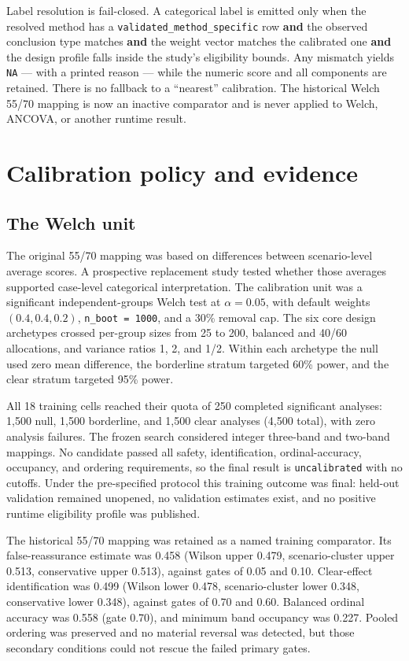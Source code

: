Label resolution is fail-closed. A categorical label is emitted only when the
resolved method has a \texttt{validated\_method\_specific} row \textbf{and} the observed
conclusion type matches \textbf{and} the weight vector matches the calibrated one
\textbf{and} the design profile falls inside the study's eligibility bounds. Any
mismatch yields \texttt{NA} --- with a printed reason --- while the numeric score and
all components are retained. There is no fallback to a ``nearest'' calibration.
The historical Welch 55/70 mapping is now an inactive comparator and is never
applied to Welch, ANCOVA, or another runtime result.

\section{Calibration policy and evidence}\label{calibration-policy-and-evidence}

\subsection{The Welch unit}\label{the-welch-unit}

The original 55/70 mapping was based on differences between scenario-level
average scores. A prospective replacement study tested whether those averages
supported case-level categorical interpretation. The calibration unit was a
significant independent-groups Welch test at \(\alpha=0.05\), with default
weights \((0.4,0.4,0.2)\), \texttt{n\_boot\ =\ 1000}, and a 30\% removal cap. The six core
design archetypes crossed per-group sizes from 25 to 200, balanced and 40/60
allocations, and variance ratios 1, 2, and 1/2. Within each archetype the null
used zero mean difference, the borderline stratum targeted 60\% power, and the
clear stratum targeted 95\% power.

All 18 training cells reached their quota of 250 completed significant
analyses: 1,500 null, 1,500 borderline, and 1,500 clear analyses (4,500 total),
with zero analysis failures. The frozen search considered integer three-band
and two-band mappings. No candidate passed all safety, identification,
ordinal-accuracy, occupancy, and ordering requirements, so the final result is
\texttt{uncalibrated} with no cutoffs. Under the pre-specified protocol this training
outcome was final: held-out validation remained unopened, no validation
estimates exist, and no positive runtime eligibility profile was published.

The historical 55/70 mapping was retained as a named training comparator. Its
false-reassurance estimate was 0.458
(Wilson upper 0.479,
scenario-cluster upper 0.513,
conservative upper 0.513),
against gates of 0.05 and 0.10. Clear-effect identification was
0.499
(Wilson lower 0.478,
scenario-cluster lower 0.348,
conservative lower 0.348),
against gates of 0.70 and 0.60. Balanced ordinal accuracy was
0.558 (gate 0.70),
and minimum band occupancy was
0.227. Pooled ordering
was preserved and no material reversal was detected, but those secondary
conditions could not rescue the failed primary gates.

